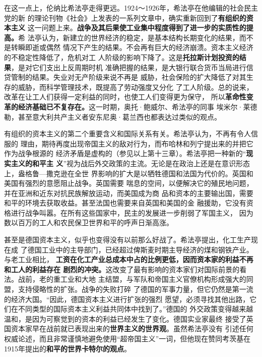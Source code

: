 在这一点上，伦纳比希法亭走得更远。1924～1926年，希法亭在他编辑的社会民主党的新
的理论刊物《社会》上发表的一系列文章中，确实重新回到了\textbf{有组织的资本主义}
这一问题上来。\textbf{战争及其后果使工业集中程度得到了进一步的实质性的提高。}希
法亭认为，新建立的世界经济的稳定，是基本结构长期变化的结果，而不是转瞬即逝或偶然
情况下产生的结果。不会再有巨大的经济崩溃。资本主义经济的不稳定性降低了，危机对工
人阶级的影响下降了。这是\textbf{托拉斯计划投资的结果}，是对它们支出上反周期时机
准确把握的结果，是大银行联合货币当局进行信贷管制的结果。失业对无产阶级来说不再是
威胁，社会保险的扩大降低了对其生存的威胁，而科学管理技术，既提高了劳动强度又分化
了工人阶级。总的说来，改革在让工人们获得一定利益的同时，也使工人们变得更为保守，
所以\textbf{革命性变革的经济基础已不复存在。}这一时期，奥托·鲍威尔、希法亭的同事
埃米尔·莱德勒，甚至意大利共产主义者安东尼奥·葛兰西也都表达过类似的观点。

有组织的资本主义的第二个重要含义和国际关系有关。希法亭认为，不再有令人信服的
理由，期待再度出现帝国主义的敌对行为，而布哈林和列宁提出来的并把它作为战争根源的
经济矛盾是虚构的（参见以上第十三章）。希法亭把一种新的“\textbf{现实主义的和平主
义}”视为战后外交政策的主流。无论是在政治上还是在意识形态上，盎格鲁—撒克逊在全世
界影响的扩大是以牺牲德国和法国为代价的。英国和美国有强烈的意愿阻止战争。英国需要
喘息的空间，以便解决它的殖民地问题，并在亚洲和近东对抗民族解放运动，而美国成为商
品和资本的主要输出国，需要和平的环境去获取收益。甚至法国也需要来自英国和美国的金
融援助，它没有资格进行战争叫嚣。在所有这些国家中，民主的发展进一步削弱了军国主义，
因为数以百万的工人和农民保卫世界和平的呼声日渐高涨。

甚至是德国资本主义，似乎也变得没有以前那么好战了。希法亭提出，化工生产现在成
了德国工业中的主导部门，已经超过俾斯麦时期主导经济的煤和钢铁产业。与老工业相比，
\textbf{工资在化工产业总成本中占的比例更低，因而资本家的利益不再和工人的利益存在
剧烈的冲突。}这改变了最有影响的资本家们对国际前景的看法。战前，老的重工业和大地
主结盟，与军队和帝国主义官僚机构形成强大的同盟，支持侵略性的扩张。战争的失败打碎
了德国的军事力量，但它仍然是第一流的经济大国。“因此，德国资本主义进行扩张的强烈
愿望，必须寻找其他出路，它们在不同类型的国际资本主义利益共同体中找到了。”德国的
外交政策变得越来越温和，是因为可察觉到的资本的利益已经发生了变化。德国实业家最终
接受了英国资本家早在战前就已表现出来的\textbf{世界主义的世界观}。虽然希法亭没有
引述任何权威论述，而且非常谨慎地避免使用“超帝国主义”一词，但他现在赞同考茨基在
1915年提出的\textbf{和平的世界卡特尔的观点}。

